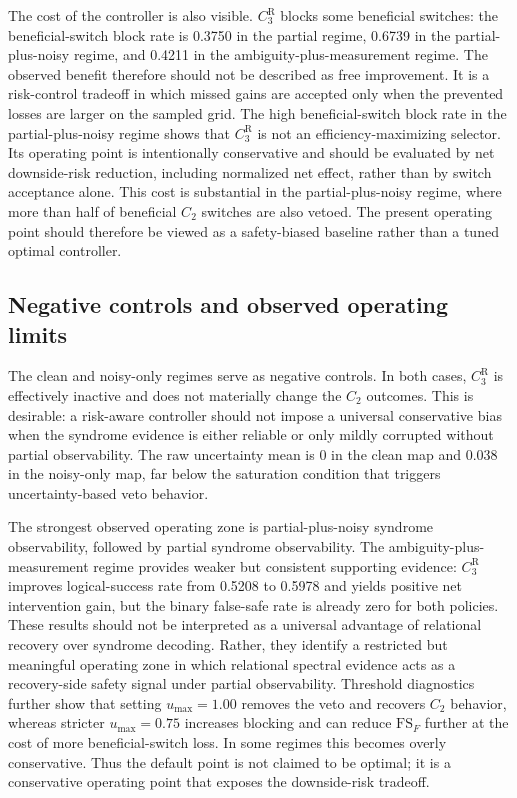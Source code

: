 \documentclass{iopjournal}
\begin{document}
The cost of the controller is also visible. $C_3^{\mathrm R}$ blocks some
beneficial switches: the beneficial-switch block rate is 0.3750 in the partial
regime, 0.6739 in the partial-plus-noisy regime, and 0.4211 in the
ambiguity-plus-measurement regime. The observed benefit therefore should not be
described as free improvement. It is a risk-control tradeoff in which missed gains
are accepted only when the prevented losses are larger on the sampled grid.
The high beneficial-switch block rate in the partial-plus-noisy regime shows that
$C_3^{\mathrm R}$ is not an efficiency-maximizing selector. Its operating point is
intentionally conservative and should be evaluated by net downside-risk reduction,
including normalized net effect, rather than by switch acceptance alone.
This cost is substantial in the partial-plus-noisy regime, where more than half
of beneficial $C_2$ switches are also vetoed. The present operating point should
therefore be viewed as a safety-biased baseline rather than a tuned optimal
controller.

\subsection{Negative controls and observed operating limits}
\label{subsec:results-limitations}

The clean and noisy-only regimes serve as negative controls. In both cases,
$C_3^{\mathrm R}$ is effectively inactive and does not materially change the
$C_2$ outcomes. This is desirable: a risk-aware controller should not impose a
universal conservative bias when the syndrome evidence is either reliable or only
mildly corrupted without partial observability. The raw uncertainty mean is 0 in
the clean map and 0.038 in the noisy-only map, far below the saturation condition
that triggers uncertainty-based veto behavior.

The strongest observed operating zone is partial-plus-noisy syndrome
observability, followed by partial syndrome observability. The
ambiguity-plus-measurement regime provides weaker but consistent supporting
evidence: $C_3^{\mathrm R}$ improves logical-success rate from 0.5208 to 0.5978
and yields positive net intervention gain, but the binary false-safe rate is
already zero for both policies. These results should not be interpreted as a
universal advantage of relational recovery over syndrome decoding. Rather, they
identify a restricted but meaningful operating zone in which relational spectral
evidence acts as a recovery-side safety signal under partial observability.
Threshold diagnostics further show that setting $u_{\max}=1.00$ removes the veto
and recovers $C_2$ behavior, whereas stricter $u_{\max}=0.75$ increases blocking
and can reduce $\mathrm{FS}_F$ further at the cost of more beneficial-switch loss.
In some regimes this becomes overly conservative. Thus the default point is not
claimed to be optimal; it is a conservative operating point that exposes the
downside-risk tradeoff.
\end{document}
